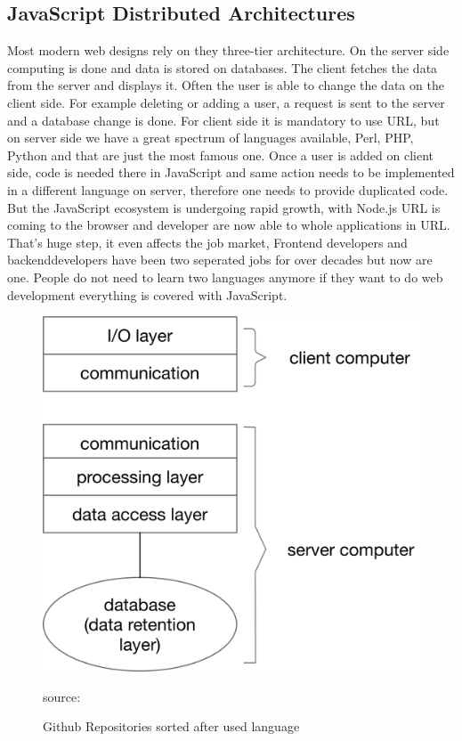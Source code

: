 \newpage

\subsection{JavaScript Distributed Architectures}
Most modern web designs rely on they three-tier architecture. On the server side computing is done and data is stored on databases. The client fetches the data from the server and displays it. Often the user is able to change the data on the client side. For example deleting or adding a user, a request is sent to the server and a database change is done. For client side it is mandatory to use \gls{URL}, but on server side we have a great spectrum of languages available, Perl, PHP, Python and that are just the most famous one. Once a user is added on client side, code is needed there in JavaScript and same action needs to be implemented in a different language on server, therefore one needs to provide duplicated code. But the JavaScript ecosystem is undergoing rapid growth, with Node.js \gls{URL} is coming to the browser and developer are now able to whole applications in \gls{URL}. That's huge step, it even affects the job market, Frontend developers and backenddevelopers have been two seperated jobs for over decades but now are one. People do not need to learn two languages anymore if they want to do web development everything is covered with JavaScript.




\begin{figure}[hb]
	\centering
	\includegraphics[scale=0.5]{bilder/grundlagen/Three-Tier.png}
	\caption{Github Repositories sorted after used language} source:\cite{JS}
	\label{fig:JS}
\end{figure}

